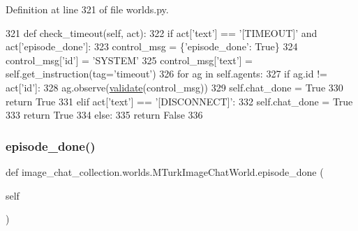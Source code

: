 Definition at line 321 of file worlds.\+py.


\begin{DoxyCode}
321     \textcolor{keyword}{def }check\_timeout(self, act):
322         \textcolor{keywordflow}{if} act[\textcolor{stringliteral}{'text'}] == \textcolor{stringliteral}{'[TIMEOUT]'} \textcolor{keywordflow}{and} act[\textcolor{stringliteral}{'episode\_done'}]:
323             control\_msg = \{\textcolor{stringliteral}{'episode\_done'}: \textcolor{keyword}{True}\}
324             control\_msg[\textcolor{stringliteral}{'id'}] = \textcolor{stringliteral}{'SYSTEM'}
325             control\_msg[\textcolor{stringliteral}{'text'}] = self.get\_instruction(tag=\textcolor{stringliteral}{'timeout'})
326             \textcolor{keywordflow}{for} ag \textcolor{keywordflow}{in} self.agents:
327                 \textcolor{keywordflow}{if} ag.id != act[\textcolor{stringliteral}{'id'}]:
328                     ag.observe(\hyperlink{namespaceparlai_1_1core_1_1worlds_afc3fad603b7bce41dbdc9cdc04a9c794}{validate}(control\_msg))
329             self.chat\_done = \textcolor{keyword}{True}
330             \textcolor{keywordflow}{return} \textcolor{keyword}{True}
331         \textcolor{keywordflow}{elif} act[\textcolor{stringliteral}{'text'}] == \textcolor{stringliteral}{'[DISCONNECT]'}:
332             self.chat\_done = \textcolor{keyword}{True}
333             \textcolor{keywordflow}{return} \textcolor{keyword}{True}
334         \textcolor{keywordflow}{else}:
335             \textcolor{keywordflow}{return} \textcolor{keyword}{False}
336 
\end{DoxyCode}
\mbox{\label{classimage__chat__collection_1_1worlds_1_1MTurkImageChatWorld_a27c215716de1649559eca384ed71d0f8}} 
\subsubsection{\texorpdfstring{episode\+\_\+done()}{episode\_done()}}
{\footnotesize\ttfamily def image\+\_\+chat\+\_\+collection.\+worlds.\+M\+Turk\+Image\+Chat\+World.\+episode\+\_\+done (\begin{DoxyParamCaption}\item[{}]{self }\end{DoxyParamCaption})}



